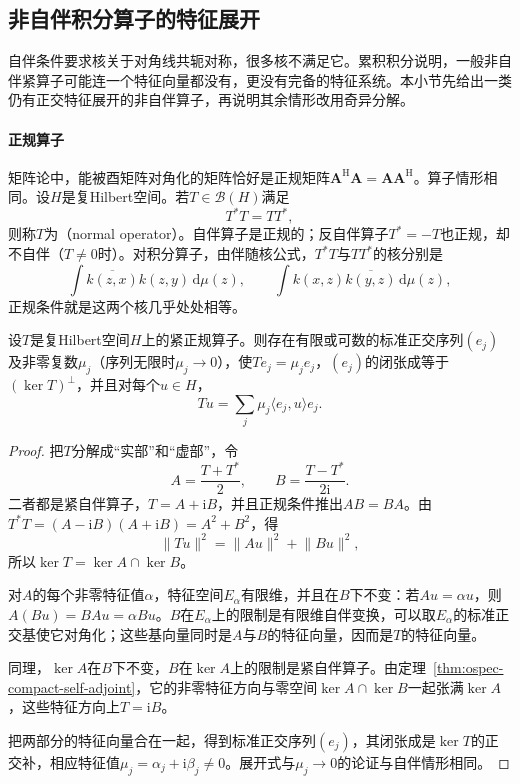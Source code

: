 \subsection{非自伴积分算子的特征展开}
\label{sec:ospec-non-self-adjoint-kernel}

自伴条件要求核关于对角线共轭对称，很多核不满足它。累积积分说明，一般非自伴紧算子可能连一个特征向量都没有，更没有完备的特征系统。本小节先给出一类仍有正交特征展开的非自伴算子，再说明其余情形改用奇异分解。

\paragraph{正规算子}
矩阵论中，能被酉矩阵对角化的矩阵恰好是正规矩阵$\bm A^{\mathrm H}\bm A=\bm A\bm A^{\mathrm H}$。算子情形相同。设$H$是复Hilbert空间。若$T\in\mathcal B(H)$满足
\begin{equation}
T^*T=TT^* ,
\label{eq:ospec-normal}
\end{equation}
则称$T$为（normal operator）。自伴算子是正规的；反自伴算子$T^*=-T$也正规，却不自伴（$T\neq0$时）。对积分算子，由伴随核公式，$T^*T$与$TT^*$的核分别是
\[
\int\overline{k(z,x)}k(z,y)\,\mathrm d\mu(z),\qquad\int k(x,z)\overline{k(y,z)}\,\mathrm d\mu(z),
\]
正规条件就是这两个核几乎处处相等。

\begin{theorem}[紧正规算子的谱分解]
\label{thm:ospec-compact-normal}
设$T$是复Hilbert空间$H$上的紧正规算子。则存在有限或可数的标准正交序列$(e_j)$及非零复数$\mu_j$（序列无限时$\mu_j\to0$），使$Te_j=\mu_je_j$，$(e_j)$的闭张成等于$(\ker T)^\perp$，并且对每个$u\in H$，
\begin{equation}
Tu=\sum_j\mu_j\langle e_j,u\rangle e_j .
\label{eq:ospec-normal-expansion}
\end{equation}
\end{theorem}

\begin{proof}
把$T$分解成“实部”和“虚部”，令
\[
A=\frac{T+T^*}{2},\qquad B=\frac{T-T^*}{2\mathrm i}.
\]
二者都是紧自伴算子，$T=A+\mathrm iB$，并且正规条件推出$AB=BA$。由$T^*T=(A-\mathrm iB)(A+\mathrm iB)=A^2+B^2$，得
\[
\lVert Tu\rVert^2=\lVert Au\rVert^2+\lVert Bu\rVert^2,
\]
所以$\ker T=\ker A\cap\ker B$。

对$A$的每个非零特征值$\alpha$，特征空间$E_\alpha$有限维，并且在$B$下不变：若$Au=\alpha u$，则$A(Bu)=BAu=\alpha Bu$。$B$在$E_\alpha$上的限制是有限维自伴变换，可以取$E_\alpha$的标准正交基使它对角化；这些基向量同时是$A$与$B$的特征向量，因而是$T$的特征向量。

同理，$\ker A$在$B$下不变，$B$在$\ker A$上的限制是紧自伴算子。由定理~\ref{thm:ospec-compact-self-adjoint}，它的非零特征方向与零空间$\ker A\cap\ker B$一起张满$\ker A$，这些特征方向上$T=\mathrm iB$。

把两部分的特征向量合在一起，得到标准正交序列$(e_j)$，其闭张成是$\ker T$的正交补，相应特征值$\mu_j=\alpha_j+\mathrm i\beta_j\neq0$。展开式与$\mu_j\to0$的论证与自伴情形相同。
\end{proof}

